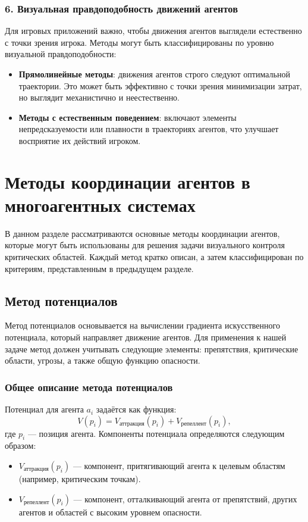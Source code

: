 \subsubsection*{6. Визуальная правдоподобность движений агентов}
Для игровых приложений важно, чтобы движения агентов выглядели естественно с точки зрения игрока.
Методы могут быть классифицированы по уровню визуальной правдоподобности:
\begin{itemize}
	\item \textbf{Прямолинейные методы}: движения агентов строго следуют оптимальной траектории.
	Это может быть эффективно с точки зрения минимизации затрат, но выглядит механистично и неестественно.  
	\item \textbf{Методы с естественным поведением}: включают элементы непредсказуемости или плавности в траекториях агентов, что улучшает восприятие их действий игроком.
\end{itemize}

\section{Методы координации агентов в многоагентных системах}

В данном разделе рассматриваются основные методы координации агентов, которые могут быть использованы для решения задачи визуального контроля критических областей. Каждый метод кратко описан, а затем классифицирован по критериям, представленным в предыдущем разделе.

\subsection{Метод потенциалов}
Метод потенциалов основывается на вычислении градиента искусственного потенциала, который направляет движение агентов.
Для применения к нашей задаче метод должен учитывать следующие элементы: препятствия, критические области, угрозы, а также общую функцию опасности.

\subsubsection*{Общее описание метода потенциалов}
Потенциал для агента $a_i$ задаётся как функция:
\begin{equation}
	V(p_i) = V_{\text{аттракция}}(p_i) + V_{\text{репеллент}}(p_i),
\end{equation}
где $p_i$ — позиция агента.  
Компоненты потенциала определяются следующим образом:  
\begin{itemize}
	\item $V_{\text{аттракция}}(p_i)$ — компонент, притягивающий агента к целевым областям (например, критическим точкам).
	\item $V_{\text{репеллент}}(p_i)$ — компонент, отталкивающий агента от препятствий, других агентов и областей с высоким уровнем опасности.
\end{itemize}

